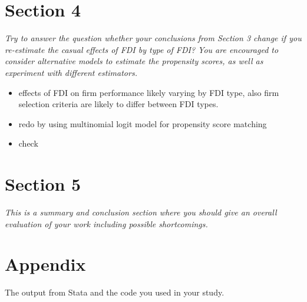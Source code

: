 \documentclass[11pt,a4paper,leqno]{article}
\begin{document}
\section*{Section 4}
\textit{Try to answer the question whether your conclusions from Section 3 change if you re-estimate the casual effects of FDI by type of FDI? You are encouraged to consider alternative models to estimate the propensity scores, as well as experiment with different estimators.}

\begin{itemize}
	\item effects of FDI on firm performance likely varying by FDI type, also firm selection criteria are likely to differ between FDI types. 
	\item redo by using multinomial logit model for propensity score matching
	\item check 
\end{itemize}

\section*{Section 5} 
\textit{This is a summary and conclusion section where you should give an overall evaluation of your work including possible shortcomings.}

\nocite{chen2011}
\clearpage



\appendix
\section*{Appendix}
The output from Stata and the code you used in your study.
\end{document}
